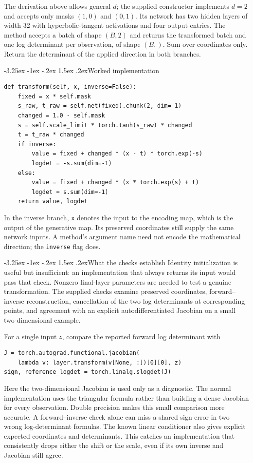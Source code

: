 \documentclass[11pt,a4paper]{article}
\makeatletter
\renewcommand\subsection{\@startsection{subsection}{2}{\z@}%
  {-3.25ex \@plus -1ex \@minus -.2ex}%
  {1.5ex \@plus .2ex}{\normalfont\large}}
\makeatother
\begin{document}
The derivation above allows general $d$; the supplied constructor implements
$d=2$ and accepts only masks $(1,0)$ and $(0,1)$. Its network has two hidden
layers of width 32 with hyperbolic-tangent activations and four output entries.
The method accepts a batch of shape $(B,2)$ and returns the transformed batch
and one log determinant per observation, of shape $(B,)$. Sum over coordinates
only. Return the determinant of the applied direction in both branches.

\subsection{Worked implementation}
\begin{lstlisting}
def transform(self, x, inverse=False):
    fixed = x * self.mask
    s_raw, t_raw = self.net(fixed).chunk(2, dim=-1)
    changed = 1.0 - self.mask
    s = self.scale_limit * torch.tanh(s_raw) * changed
    t = t_raw * changed
    if inverse:
        value = fixed + changed * (x - t) * torch.exp(-s)
        logdet = -s.sum(dim=-1)
    else:
        value = fixed + changed * (x * torch.exp(s) + t)
        logdet = s.sum(dim=-1)
    return value, logdet
\end{lstlisting}

In the inverse branch, \texttt{x} denotes the input to the encoding map,
which is the output of the generative map. Its preserved coordinates still
supply the same network inputs. A method's argument name need not encode the
mathematical direction; the \texttt{inverse} flag does.

\subsection{What the checks establish}
Identity initialization is useful but insufficient: an implementation that
always returns its input would pass that check. Nonzero final-layer parameters
are needed to test a genuine transformation. The supplied checks examine
preserved coordinates, forward--inverse reconstruction, cancellation of the
two log determinants at corresponding points, and agreement with an explicit
autodifferentiated Jacobian on a small two-dimensional example.

For a single input $z$, compare the reported forward log determinant with
\begin{lstlisting}
J = torch.autograd.functional.jacobian(
    lambda v: layer.transform(v[None, :])[0][0], z)
sign, reference_logdet = torch.linalg.slogdet(J)
\end{lstlisting}
Here the two-dimensional Jacobian is used only as a diagnostic. The normal
implementation uses the triangular formula rather than building a dense
Jacobian for every observation. Double precision makes this small comparison
more accurate. A forward--inverse check alone can miss a shared sign error
in two wrong log-determinant formulas.
The known linear conditioner also gives explicit expected coordinates and
determinants. This catches an implementation that consistently drops either
the shift or the scale, even if its own inverse and Jacobian still agree.
\end{document}
